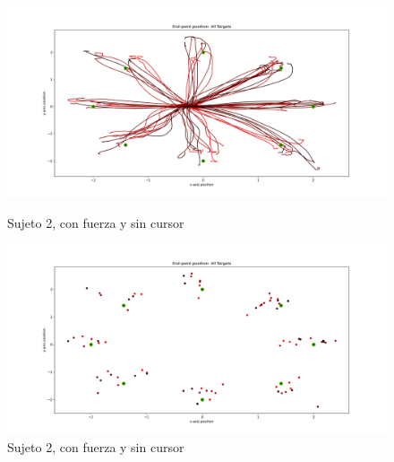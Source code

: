 \documentclass[a4paper,11pt, oneside]{book}
\begin{document}
\begin{figure}[H]
	\begin{minipage}[b]{0.5\linewidth}
		\centering
		\includegraphics[width=\linewidth]{sujeto2/force_no_cursor/trayectorias}
		\caption{Sujeto 2, con fuerza y sin cursor}
		\label{2-fase4-1}
	\end{minipage}
	\hspace{0.5cm}
	\begin{minipage}[b]{0.5\linewidth}
		\centering
		\includegraphics[width=\linewidth]{sujeto2/force_no_cursor/trayectorias_puntos}
		\caption{Sujeto 2, con fuerza y sin cursor}
		\label{2-fase4-2}
	\end{minipage}
\end{figure}
\end{document}
